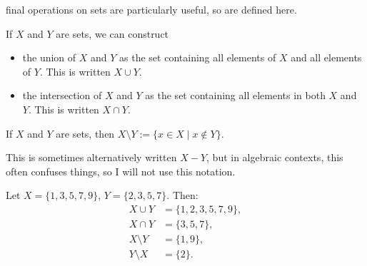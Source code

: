  final operations on sets are particularly useful, so are defined here.

\begin{definition}
    If $X$ and $Y$ are sets, we can construct
    \begin{itemize}
        \item the union of $X$ and $Y$ as the set containing all elements of $X$ and all elements of $Y$. This is written $X \cup Y$.
        \item the intersection of $X$ and $Y$ as the set containing all elements in both $X$ and $Y$. This is written $X \cap Y$.
    \end{itemize}
\end{definition}
\begin{definition}[Subtraction]
    If $X$ and $Y$ are sets, then $X \setminus Y := \{ x \in X \mid x \notin Y \}$.
\end{definition}
\begin{remark}
    This is sometimes alternatively written $X - Y$, but in algebraic contexts, this often confuses things, so I will not use this notation.
\end{remark}
\begin{example}
    Let $X = \{1, 3, 5, 7, 9\}$, $Y = \{2, 3, 5, 7\}$. Then:
    \begin{align*}
        X \cup Y &= \{1, 2, 3, 5, 7, 9\}, \\
        X \cap Y &= \{3, 5, 7\}, \\
        X \setminus Y &= \{1, 9\}, \\
        Y \setminus X &= \{2\}.
    \end{align*}
\end{example}